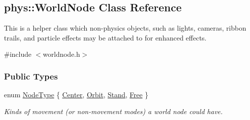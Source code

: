 \hypertarget{classphys_1_1WorldNode}{
\subsection{phys::WorldNode Class Reference}
\label{d2/d3e/classphys_1_1WorldNode}
}


This is a helper class which non-\/physics objects, such as lights, cameras, ribbon trails, and particle effects may be attached to for enhanced effects.  




{\ttfamily \#include $<$worldnode.h$>$}

\subsubsection*{Public Types}
\begin{DoxyCompactItemize}
\item 
enum \hyperlink{classphys_1_1WorldNode_a0b178b06aa411b00c4c2ccd926d9bf5a}{NodeType} \{ \hyperlink{classphys_1_1WorldNode_a0b178b06aa411b00c4c2ccd926d9bf5aa06be3334346d6ba7913197ee0dd5b8bb}{Center}, 
\hyperlink{classphys_1_1WorldNode_a0b178b06aa411b00c4c2ccd926d9bf5aae9751e5fc4396425fbd7b93171541a22}{Orbit}, 
\hyperlink{classphys_1_1WorldNode_a0b178b06aa411b00c4c2ccd926d9bf5aa2ae400375e79106ae01adf39dd5c1185}{Stand}, 
\hyperlink{classphys_1_1WorldNode_a0b178b06aa411b00c4c2ccd926d9bf5aaa4f848b95586fc581aa1f749c82a1fb5}{Free}
 \}
\begin{DoxyCompactList}\small\item\em Kinds of movement (or non-\/movement modes) a world node could have. \item\end{DoxyCompactList}\end{DoxyCompactItemize}
